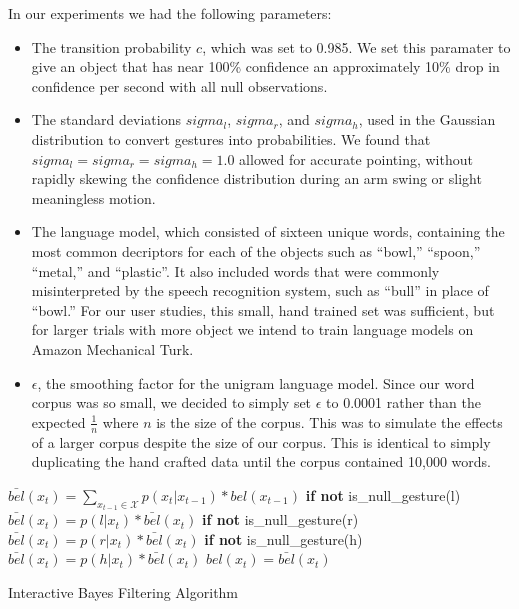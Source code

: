 \documentclass[a4paper, 11pt]{article} %
\begin{document}
In our experiments we had the following parameters:\begin{itemize}
\item The transition probability $c$, which was set to 0.985. We set this paramater to give an object that has near 100\% confidence an approximately 10\% drop in confidence per second with all null observations.
\item The standard deviations $sigma_l$, $sigma_r$, and $sigma_h$, used in the Gaussian distribution to convert gestures into probabilities. We found that $sigma_l = sigma_r = sigma_h = 1.0$ allowed for accurate pointing, without rapidly skewing the confidence distribution during an arm swing or slight meaningless motion.
\item The language model, which consisted of sixteen unique words, containing the most common decriptors for each of the objects such as ``bowl,'' ``spoon,'' ``metal,'' and ``plastic''. It also included words that were commonly misinterpreted by the speech recognition system, such as ``bull'' in place of ``bowl.'' For our user studies, this small, hand trained set was sufficient, but for larger trials with more object we intend to train language models on Amazon Mechanical Turk.
\item $\epsilon$, the smoothing factor for the unigram language model. Since our word corpus was so small, we decided to simply set $\epsilon$ to 0.0001 rather than the expected $\frac{1}{n}$ where $n$ is the size of the corpus. This was to simulate the effects of a larger corpus despite the size of our corpus. This is identical to simply duplicating the hand crafted data until the corpus contained 10,000 words.
\end{itemize}
\begin{algorithm}
    \DontPrintSemicolon
    \BlankLine
    \BlankLine
     {
      $\bar{bel}(x_t) = \displaystyle\sum_{x_{t-1} \in \mathcal{X}} p(x_t|x_{t-1})*bel(x_{t-1})$
      \BlankLine
      \textbf{if not} is\_null\_gesture(l)
      \BlankLine
      \Indp$\bar{bel}(x_t) = p(l | x_t) *  \bar{bel}(x_t)$
      \BlankLine
      \Indm\textbf{if not} is\_null\_gesture(r)
      \BlankLine
      \Indp$\bar{bel}(x_t) = p(r | x_t) *  \bar{bel}(x_t)$
      \BlankLine
      \Indm\textbf{if not} is\_null\_gesture(h)
      \BlankLine
      \Indp$\bar{bel}(x_t) = p(h | x_t) *  \bar{bel}(x_t)$
      \BlankLine
      \Indm{}
      $bel(x_t) = \bar{bel}(x_t)$
    }
    \BlankLine
\caption{Interactive Bayes Filtering Algorithm} 
\label{alg:algorithm}
\end{algorithm}
\end{document}
